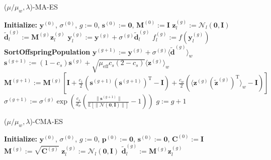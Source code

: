 \documentclass{book}
\begin{document}
\begin{itemize}
\begin{algorithm}[H]
\begin{algorithmic}[1]
        \end{algorithmic}
    \end{algorithm}
    \begin{algorithm}[H]
    \caption{(\(\mu/\mu_w, \lambda\))-MA-ES}
        \begin{algorithmic}[1]
            \STATE \textbf{Initialize:} \(\mathbf{y}^{(0)}\), \(\sigma^{(0)}\), \(g := 0\), \(\mathbf{s}^{(0)} := \mathbf{0}\), \(\mathbf{M}^{(0)} := \mathbf{I}\)
            \REPEAT
            \STATE \(\mathbf{z}_l^{(g)} := \mathcal{N}_l(\mathbf{0}, \mathbf{I})\)
            \STATE \(\tilde{\mathbf{d}}_l^{(g)} := \mathbf{M}^{(g)}\mathbf{z}_l^{(g)}\)
            \STATE \(\mathbf{y}_l^{(g)} := \mathbf{y}^{(g)} + \sigma^{(g)}\tilde{\mathbf{d}}_l^{(g)}\)
            \STATE \(f_l^{(g)} := f(\mathbf{y}_l^{(g)})\)
            \ENDFOR
            \STATE \textbf{SortOffspringPopulation}
            \STATE \(\mathbf{y}^{(g+1)} := \mathbf{y}^{(g)} + \sigma^{(g)} \langle \tilde{\mathbf{d}}^{(g)} \rangle_w\)
            \STATE \(\mathbf{s}^{(g+1)} := (1 - c_s)\mathbf{s}^{(g)} + \sqrt{\mu_{\operatorname{eff}}c_s(2-c_s)} \langle \mathbf{z}^{(g)} \rangle_w\)
            \STATE \(\mathbf{M}^{(g+1)} := \mathbf{M}^{(g)} \left[ \mathbf{I} + \frac{c_1}{2} \left( \mathbf{s}^{(g+1)}(\mathbf{s}^{(g+1)})^\mathrm{T} - \mathbf{I} \right) + \frac{c_w}{2} \left( \langle \mathbf{z}^{(g)}(\tilde{\mathbf{z}}^{(g)})^\mathrm{T} \rangle_w - \mathbf{I} \right) \right]\)
            \STATE \(\sigma^{(g+1)} := \sigma^{(g)} \exp \left( \frac{c_s}{d_\sigma} \left( \frac{\|\mathbf{s}^{(g+1)}\|}{\mathbb{E}[\|\mathcal{N}(\mathbf{0}, \mathbf{I})\|]} - 1 \right) \right)\)
            \STATE \(g := g + 1\)
        \end{algorithmic}
    \end{algorithm}
    \begin{algorithm}[H]
    \caption{(\(\mu/\mu_w, \lambda\))-CMA-ES}
        \begin{algorithmic}[1]
            \STATE \textbf{Initialize:} \(\mathbf{y}^{(0)}\), \(\sigma^{(0)}\), \(g := 0\), \(\mathbf{p}^{(0)} := \mathbf{0}\), \(\mathbf{s}^{(0)} := \mathbf{0}\), \(\mathbf{C}^{(0)} := \mathbf{I}\)
            \REPEAT
            \STATE \(\mathbf{M}^{(g)} := \sqrt{\mathbf{C}^{(g)}}\)
            \STATE \(\mathbf{z}_l^{(g)} := \mathcal{N}_l(\mathbf{0}, \mathbf{I})\)
            \STATE \(\tilde{\mathbf{d}}_l^{(g)} := \mathbf{M}^{(g)}\mathbf{z}_l^{(g)}\)

\end{algorithmic}
\end{algorithm}
\end{itemize}
\end{document}
